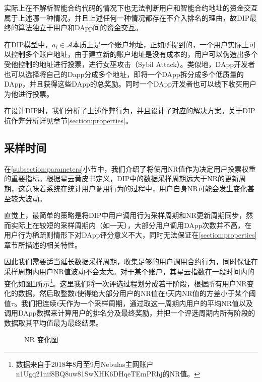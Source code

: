 实际上在不解析智能合约代码的情况下也无法判断用户和智能合约地址的资金交互属于上述哪一种情况，并且上述任何一种情况都存在不介入排名的理由，故DIP最终的算法独立于用户和DApp间的资金交互。

在DIP模型中，$a_i \in \mathcal{A}$本质上是一个账户地址，正如\cite{Nabulasyellowpaper}所提到的，一个用户实际上可以控制多个账户地址，由于建立新的账户地址是没有成本的，用户可以伪造出多个受他控制的地址进行投票，进行女巫攻击（Sybil Attack）。类似地，DApp开发者也可以选择将自己的Dapp分成多个地址，即将一个DApp拆分成多个低质量的DApp，并且获得这些DApp的总奖励。同时一个DApp开发者也可以线下收买用户为他进行投票。

在设计DIP时，我们分析了上述作弊行为，并且设计了对应的解决方案。关于DIP抗作弊分析详见章节\ref{section:properties}。



\subsection{采样时间}
\label{subsection:interval}

在\ref{subsection:parameters}小节中，我们介绍了将使用NR值作为决定用户投票权重的重要指标。根据星云黄皮书定义\cite{Nebulasyellowpaper}，DIP中的数据采样周期远大于NR的更新周期，这意味着系统在统计用户调用行为的过程中，用户自身NR可能会发生变化甚至较大波动。

直觉上，最简单的策略是将DIP中用户调用行为采样周期和NR更新周期同步，然而实际上在较短的采样周期内（如一天），大部分用户调用DApp次数并不高，在用户行为稀疏则情形下对DApp评分意义不大，同时无法保证在\ref{section:properties}章节所描述的相关特性。

因此我们需要适当延长数据采样周期，收集足够的用户调用合约行为，同时保证在采样周期内用户NR值波动不会太大。对于某个账户，其星云指数在一段时间内的变化如图\ref{fig:nr}所示\footnote{数据来自于2018年8月至9月Nebulas主网账户n1Ugq21nif8BQ8uw81SwXHK6DHqeTEmPRhj的NR值。}。这里我们将一次评选过程划分成若干阶段，根据所有用户NR变化的数据，然后取整数$t$使得绝大部分用户的NR值在$t$天内NR值的方差小于某个阈值$\tau$。我们把连续$t$天作为一个采样周期，通过取这一周期内用户的平均NR值以及调用DApp数据来计算用户的排名分及最终奖励，并把一个评选周期内所有阶段的数据取其平均值最为最终结果。%


\begin{figure}
\label{fig:nr}
  \centering
  
  \caption{NR 变化图}
\end{figure}
